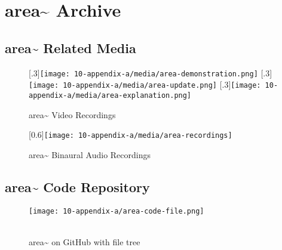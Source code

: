 \chapter{area\textasciitilde{} Archive}\label{sec: appendix-a}

\section{area\textasciitilde{} Related Media}
\begin{figure}[!ht]
    \centering
    [.3\linewidth]{\texttt{[image: 10-appendix-a/media/area-demonstration.png]}}%
    \hfill
    [.3\linewidth]{\texttt{[image: 10-appendix-a/media/area-update.png]}}
    \hfill
    [.3\linewidth]{\texttt{[image: 10-appendix-a/media/area-explanation.png]}}
    \caption*{area\textasciitilde{} Video Recordings}
\end{figure}
\vspace*{1cm}
\begin{figure}[!ht]
    \centering
    [0.6\linewidth]{\texttt{[image: 10-appendix-a/media/area-recordings]}}
    \caption*{area\textasciitilde{} Binaural Audio Recordings}\label{sec: appendix-a-media}
\end{figure}
\clearpage



\section{area\textasciitilde{} Code Repository}
\begin{figure}[!ht]
    \texttt{[image: 10-appendix-a/area-code-file.png]}
    \caption*{ \\ area\textasciitilde{} on GitHub with file tree}\label{sec: appendix-a-code}
\end{figure}
\clearpage



